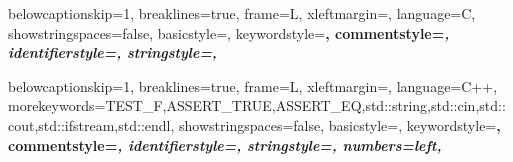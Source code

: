 {
  belowcaptionskip=1\baselineskip,
  breaklines=true,
  frame=L,
  xleftmargin=\parindent,
  language=C,
  showstringspaces=false,
  basicstyle=\cnt \fontsize{9}{10.8}\selectfont,
  keywordstyle=\bfseries\color{green!40!black},
  commentstyle=\itshape\color{purple!40!black},
  identifierstyle=\color{blue},
  stringstyle=\color{orange},
}

{
  belowcaptionskip=1\baselineskip,
  breaklines=true,
  frame=L,
  xleftmargin=\parindent,
  language=C++,
  morekeywords={TEST_F,ASSERT_TRUE,ASSERT_EQ,std::string,std::cin,std::cout,std::ifstream,std::endl},
  showstringspaces=false,
  basicstyle=\cnt \fontsize{9}{10.8}\selectfont, 
  keywordstyle=\bfseries\color{Fuchsia}, %
  commentstyle=\itshape\color{NavyBlue},
  identifierstyle=\color{ForestGreen},
  stringstyle=\color{black},
  numbers=left,
}

\renewcommand\listfigurename{فهرست شکل‌ها و نمودارها}  
\renewcommand\listtablename{فهرست جدول‌ها}
\renewcommand\bibname{\rl{فهرست منابع}}


